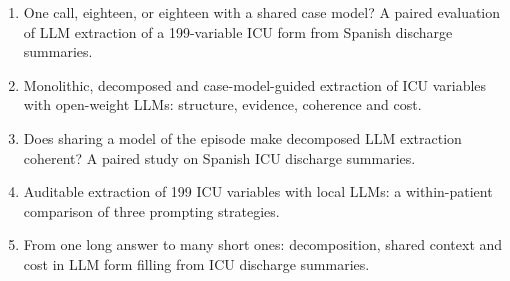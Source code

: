 \begin{tcolorbox}[colback=gray!5,colframe=gray!50,title=Alternative titles (for author selection),fonttitle=\sffamily\bfseries]
\begin{enumerate}
\item One call, eighteen, or eighteen with a shared case model? A paired evaluation of LLM extraction of a
199-variable ICU form from Spanish discharge summaries.
\item Monolithic, decomposed and case-model-guided extraction of ICU variables with open-weight LLMs: structure,
evidence, coherence and cost.
\item Does sharing a model of the episode make decomposed LLM extraction coherent? A paired study on Spanish ICU
discharge summaries.
\item Auditable extraction of 199 ICU variables with local LLMs: a within-patient comparison of three prompting
strategies.
\item From one long answer to many short ones: decomposition, shared context and cost in LLM form filling from
ICU discharge summaries.
\end{enumerate}
\end{tcolorbox}
